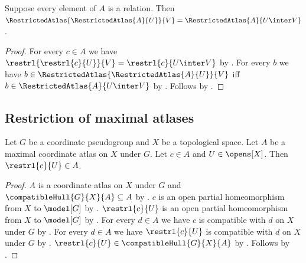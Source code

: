 \begin{theorem}\label{restricted_atlas_composition}
    Suppose every element of $A$ is a relation.
    Then $\RestrictedAtlas{\RestrictedAtlas{A}{U}}{V}=\RestrictedAtlas{A}{U\inter V}$.
\end{theorem}
\begin{proof}
    For every $c\in A$ we have $\restrl{\restrl{c}{U}}{V}=\restrl{c}{U\inter V}$ by
        .
    For every $b$ we have $b\in\RestrictedAtlas{\RestrictedAtlas{A}{U}}{V}$ iff
        $b\in\RestrictedAtlas{A}{U\inter V}$ by .
    Follows by .
\end{proof}

\subsection{Restriction of maximal atlases}

\begin{theorem}\label{maximal_atlas_restriction_member}
    Let $G$ be a coordinate pseudogroup and $X$ be a topological space.
    Let $A$ be a maximal coordinate atlas on $X$ under $G$.
    Let $c\in A$ and $U\in\opens[X]$.
    Then $\restrl{c}{U}\in A$.
\end{theorem}
\begin{proof}
    $A$ is a coordinate atlas on $X$ under $G$ and $\compatibleHull{G}{X}{A}\subseteq A$ by
        .
    $c$ is an open partial homeomorphism from $X$ to $\model[G]$ by .
    $\restrl{c}{U}$ is an open partial homeomorphism from $X$ to $\model[G]$ by
        .
    For every $d\in A$ we have $c$ is compatible with $d$ on $X$ under $G$ by
        .
    For every $d\in A$ we have $\restrl{c}{U}$ is compatible with $d$ on $X$ under $G$ by
        .
    $\restrl{c}{U}\in\compatibleHull{G}{X}{A}$ by .
    Follows by .
\end{proof}

